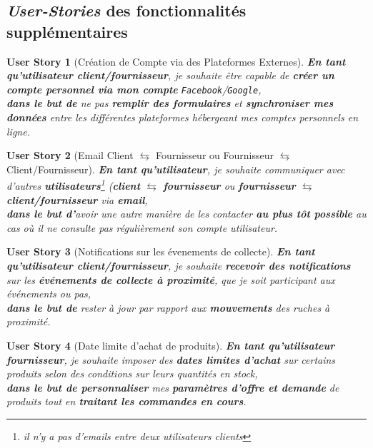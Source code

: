 \documentclass[a4paper,12pt]{report}
\theoremstyle{break}
\newtheorem*{userStory}{User Story}
\theoremstyle{break}
\theoremstyle{break}
\theoremstyle{break}
\theoremstyle{definition}
\theoremstyle{remark}
\begin{document}
\subsection{\textit{User-Stories} des fonctionnalités supplémentaires}
\begin{userStory}[Création de Compte via des Plateformes Externes]
\textbf{En tant qu'utilisateur {\color{green}client}/{\color{red}fournisseur}}, je souhaite être capable de \textbf{créer un compte personnel via mon compte} \texttt{Facebook}/\texttt{Google},\\
\indent
\textbf{dans le but de} ne pas \textbf{remplir des formulaires} et \textbf{synchroniser mes données} entre les différentes plateformes hébergeant mes comptes personnels en ligne.
\end{userStory}

\begin{userStory}[Email Client $\leftrightarrows$ Fournisseur ou Fournisseur $\leftrightarrows$ Client/Fournisseur]
\textbf{En tant qu'utilisateur}, je souhaite communiquer avec d'autres \textbf{utilisateurs}\footnote{il n'y a pas d'emails entre deux utilisateurs {\color{green}clients}} (\textbf{{\color{green}client}} $\leftrightarrows$ \textbf{{\color{red}fournisseur}} ou \textbf{{\color{red}fournisseur}} $\leftrightarrows$ \textbf{{\color{green}client}/{\color{red}fournisseur}} via \textbf{email},\\
\indent
\textbf{dans le but d'}avoir une autre manière de les contacter \textbf{au plus tôt possible} au cas où il ne consulte pas régulièrement son compte utilisateur.
\end{userStory}

\begin{userStory}[Notifications sur les évenements de collecte]
\textbf{En tant qu'utilisateur {\color{green}client}/{\color{red}fournisseur}}, je souhaite \textbf{recevoir des notifications} sur les \textbf{événements de collecte à proximité}, que je soit participant aux événements ou pas,\\
\indent
\textbf{dans le but de} rester à jour par rapport aux \textbf{mouvements} des ruches à proximité.
\end{userStory}

\begin{userStory}[Date limite d'achat de produits]
\textbf{En tant qu'utilisateur {\color{red}fournisseur}}, je souhaite imposer des \textbf{dates limites d'achat} sur certains produits selon des conditions sur leurs quantités en stock,\\
\indent
\textbf{dans le but de personnaliser} mes \textbf{paramètres d'offre et demande} de produits tout en \textbf{traitant les commandes en cours}.
\end{userStory}
\end{document}
